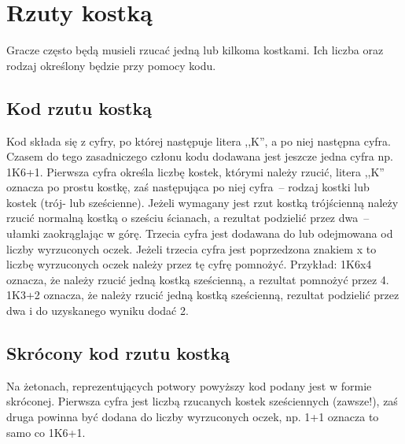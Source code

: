 \section{Rzuty kostką}

Gracze często będą musieli rzucać jedną lub kilkoma kostkami.
Ich liczba oraz rodzaj określony będzie przy pomocy kodu.

\subsection{Kod rzutu kostką}

Kod składa się z cyfry, po której następuje litera ,,K'', a po niej następna cyfra.
Czasem do tego zasadniczego członu kodu dodawana jest jeszcze jedna cyfra np. 1K6+1.
Pierwsza cyfra określa liczbę kostek, którymi należy rzucić, litera ,,K'' oznacza po prostu kostkę, zaś następująca po niej cyfra~-- rodzaj kostki lub kostek (trój- lub sześcienne).
Jeżeli wymagany jest rzut kostką trójścienną należy rzucić normalną kostką o sześciu ścianach, a rezultat podzielić przez dwa~-- ułamki zaokrąglając w górę.
Trzecia cyfra jest dodawana do lub odejmowana od liczby wyrzuconych oczek.
Jeżeli trzecia cyfra jest poprzedzona znakiem x to liczbę wyrzuconych oczek należy przez tę cyfrę pomnożyć.
Przykład: 1K6x4 oznacza, że należy rzucić jedną kostką sześcienną, a rezultat pomnożyć przez 4.
1K3+2 oznacza, że należy rzucić jedną kostką sześcienną, rezultat podzielić przez dwa i do uzyskanego wyniku dodać 2.

\subsection{Skrócony kod rzutu kostką}

Na żetonach, reprezentujących potwory powyższy kod podany jest w formie skróconej.
Pierwsza cyfra jest liczbą rzucanych kostek sześciennych (zawsze!), zaś druga powinna być dodana do liczby wyrzuconych oczek, np. 1+1 oznacza to samo co 1K6+1.
